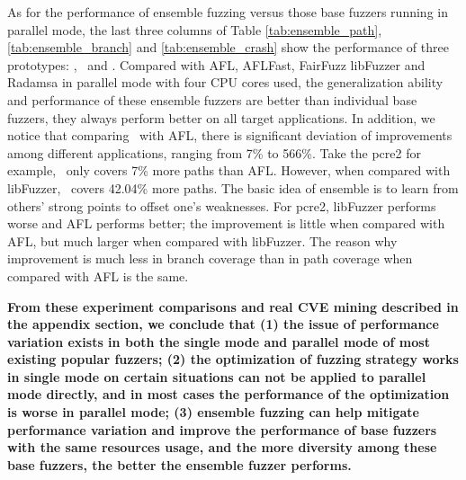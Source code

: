 As for the performance of ensemble fuzzing versus those base fuzzers running in parallel mode, the last three columns of Table \ref{tab:ensemble_path},  \ref{tab:ensemble_branch} and  \ref{tab:ensemble_crash} show the performance of three prototypes: \toolOne, \toolTwo ~and \toolThree. 
Compared with AFL, AFLFast, FairFuzz libFuzzer and Radamsa in parallel mode with four CPU cores used, the generalization ability and performance of these ensemble fuzzers are better than individual base fuzzers, they always perform better on all target applications.
%
In addition, we notice that comparing \toolThree ~with AFL, there is significant deviation of improvements among different applications, ranging from 7\% to 566\%. Take the pcre2 for example, \toolThree ~only covers 7\% more paths than AFL. However, when compared with libFuzzer, \toolThree ~covers 42.04\% more paths. The basic idea of ensemble is to learn from others' strong points to offset one's weaknesses.
For pcre2, libFuzzer performs worse and AFL performs better; the improvement is little when compared with AFL, but much larger when compared with libFuzzer.
The reason why improvement is much less in branch coverage than in path coverage when compared with AFL is the same.

\vspace{0.2cm}
\noindent\textbf{From these experiment comparisons and real CVE mining described in the appendix section, we conclude that 
(1) the issue of performance variation exists in both the single mode and parallel mode of most existing popular fuzzers;
(2) the optimization of fuzzing strategy works in single mode on certain situations can not be applied to parallel mode directly, and in most cases the performance of the optimization is worse in parallel mode;
(3) ensemble fuzzing can help mitigate performance variation and improve the performance of base fuzzers with the same resources usage, and the more diversity among these base fuzzers, the better the ensemble fuzzer performs.}